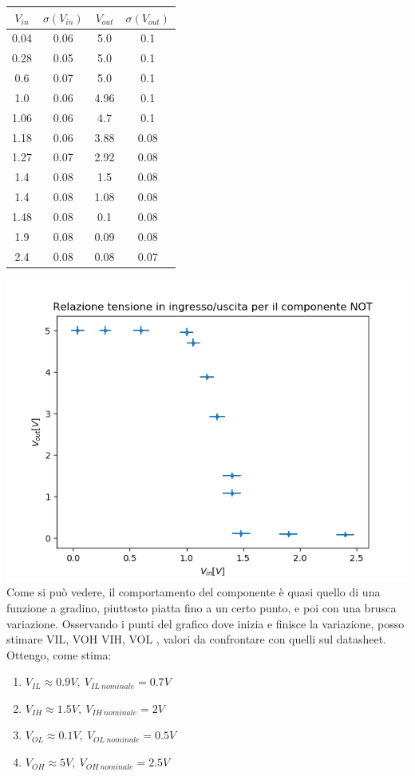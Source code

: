 \documentclass[10pt,a4paper]{article}
\begin{document}
	\begin{center}
\begin{tabular}{|c|c|c|c|}
	\hline 
	$V_{in}$ & $\sigma(V_{in})$ & $V_{out}$ & $\sigma(V_{out})$ \\ 
	\hline 
	0.04&0.06&5.0&0.1\\ \hline
	0.28&0.05&5.0&0.1\\ \hline
	0.6&0.07&5.0&0.1\\ \hline
	1.0&0.06&4.96&0.1\\ \hline
	1.06&0.06&4.7&0.1\\ \hline
	1.18&0.06&3.88&0.08\\ \hline
	1.27&0.07&2.92&0.08\\ \hline
	1.4&0.08&1.5&0.08\\ \hline
	1.4&0.08&1.08&0.08\\ \hline
	1.48&0.08&0.1&0.08\\ \hline
	1.9&0.08&0.09&0.08\\ \hline
	2.4&0.08&0.08&0.07\\ \hline
\end{tabular} 
	\end{center}
\includegraphics[scale=0.5]{gain.png}\centering
\\Come si può vedere, il comportamento del componente è quasi quello di una funzione a gradino, piuttosto piatta fino a un certo punto, e poi con una brusca variazione.
Osservando i punti del grafico dove inizia e finisce la variazione, posso stimare VIL, VOH  VIH, VOL , valori da confrontare con quelli sul datasheet.
\\Ottengo, come stima:
\begin{enumerate}
	\item $V_{IL}\approx0.9 V,~V_{IL~nominale}=0.7V$
	\item $V_{IH}		\approx 1.5V,~V_{IH~nominale}=2V$
	\item $V_{OL}\approx0.1V,~V_{OL~nominale}=0.5V$
	\item $V_{OH}\approx5V,~V_{OH~nominale}=2.5V$
\end{enumerate}
\end{document}
